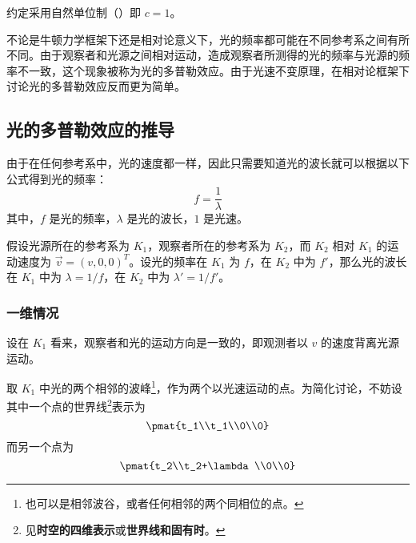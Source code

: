 

约定采用自然单位制（）即 $c=1$。

不论是牛顿力学框架下还是相对论意义下，光的频率都可能在不同参考系之间有所不同。由于观察者和光源之间相对运动，造成观察者所测得的光的频率与光源的频率不一致，这个现象被称为光的多普勒效应。由于光速不变原理，在相对论框架下讨论光的多普勒效应反而更为简单。


\subsection{光的多普勒效应的推导}
由于在任何参考系中，光的速度都一样，因此只需要知道光的波长就可以根据以下公式得到光的频率：
\begin{equation}
f=\frac{1}{\lambda}
\end{equation}
其中，$f$ 是光的频率，$\lambda$ 是光的波长，$1$ 是光速。

假设光源所在的参考系为 $K_1$，观察者所在的参考系为 $K_2$，而 $K_2$ 相对 $K_1$ 的运动速度为 $\vec{v}=(v, 0, 0)^T$。设光的频率在 $K_1$ 为 $f$，在 $K_2$ 中为 $f'$，那么光的波长在 $K_1$ 中为 $\lambda=1/f$，在 $K_2$ 中为 $\lambda'=1/f'$。

\subsubsection{一维情况}
设在 $K_1$ 看来，观察者和光的运动方向是一致的，即观测者以 $v$ 的速度背离光源运动。

取 $K_1$ 中光的两个相邻的波峰\footnote{也可以是相邻波谷，或者任何相邻的两个同相位的点。}，作为两个以光速运动的点。为简化讨论，不妨设其中一个点的世界线\footnote{见\textbf{时空的四维表示}或\textbf{世界线和固有时}。}表示为
\begin{equation}
\pmat{t_1\\t_1\\0\\0}
\end{equation}
而另一个点为
\begin{equation}
\pmat{t_2\\t_2+\lambda\\0\\0}
\end{equation}

